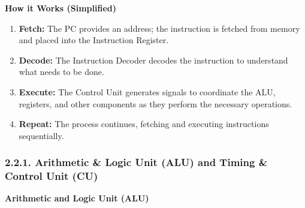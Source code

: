 \documentclass[
]{article}
\begin{document}
\textbf{How it Works (Simplified)}

\begin{enumerate}
\def\labelenumi{\arabic{enumi}.}
\item
  \textbf{Fetch:} The PC provides an address; the instruction is fetched
  from memory and placed into the Instruction Register.
\item
  \textbf{Decode:} The Instruction Decoder decodes the instruction to
  understand what needs to be done.
\item
  \textbf{Execute:} The Control Unit generates signals to coordinate the
  ALU, registers, and other components as they perform the necessary
  operations.
\item
  \textbf{Repeat:} The process continues, fetching and executing
  instructions sequentially.
\end{enumerate}

\hypertarget{221-arithmetic--logic-unit-alu-and-timing--control-unit-cu}{%
\subsubsection{2.2.1. Arithmetic \& Logic Unit (ALU) and Timing \&
Control Unit
(CU)}\label{221-arithmetic--logic-unit-alu-and-timing--control-unit-cu}}

\textbf{Arithmetic and Logic Unit (ALU)}
\end{document}
